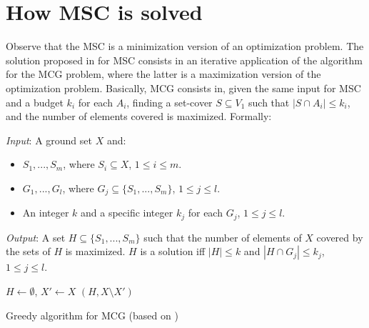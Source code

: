 \section{How MSC is solved}
\label{sec:solve_msc}
Observe that the MSC is a minimization version of an optimization problem. The solution proposed in \cite{Chekuri2004} for MSC consists in an iterative 
application of the algorithm for the MCG problem, where the latter is a maximization version of the optimization problem. Basically, MCG consists in, 
given the same input for MSC and a budget $k_i$ for each $A_i$, finding a set-cover $S \subseteq V_1$ such that $|S \cap A_i| \leq k_i$, 
and the number of elements covered is maximized. Formally:

\vspace{0.3cm}
\noindent \emph{Input}: A ground set $X$ and:
\begin{itemize}
    \item $S_1,...,S_m$, where $S_i \subseteq X$, $1 \le i \le m$.
    \item $G_1,...,G_l$, where $G_j \subseteq \lbrace S_1,...,S_m \rbrace$, $1 \le j \le l$.
    \item An integer $k$ and a specific integer $k_j$ for each $G_j$, $1 \le j \le l$.
\end{itemize}


\vspace{0.3cm}
\noindent \emph{Output}: A set $H \subseteq \lbrace S_1,...,S_m \rbrace$ such that the number of elements of $X$ covered by the sets of $H$ is maximized. 
$H$ is a solution iff $|H| \le k$ and $|H \cap G_j| \le k_j$, $1\le j \le l$.
\vspace{0.3cm}

\begin{algorithm}[t]
  $H \gets \emptyset$, $X' \gets X$\;
  \;
  \For{j=1 \emph{\KwTo} k}{
    \For{i=1 \emph{\KwTo} l}{
      \eIf{$selec[i] = False$}{
	$S_i \gets \mathcal{A}(G_i,X')$\;
      }{
	$S_i \gets \emptyset$\; 
      }
    }
    $r \gets argmax_{i}|S_i|$\;
    $selecQt[r] = selecQt[r] + 1$\;
    \lIf{$selecQt[r] = budgetsK[r]$}{$selec[r] \gets True$}\;
    $H \gets H \cup \lbrace S_r \rbrace$, $X' \gets X' \setminus S_r$\;
  }
  \Return $(H,X\setminus X')$\;
\caption{Greedy algorithm for MCG (based on \cite{Chekuri2004})} 
\label{alg:greedy}
\end{algorithm}


